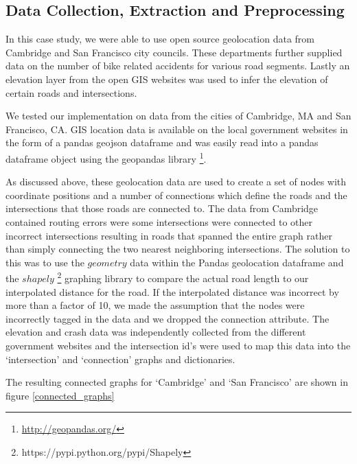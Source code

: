 \documentclass[11pt]{article}
\begin{document}
\subsection{Data Collection, Extraction and Preprocessing}
In this case study, we were able to use open source geolocation data from Cambridge and San Francisco city councils. These departments further supplied data on the number of bike related accidents for various road segments. Lastly an elevation layer from the open GIS websites was used to infer the elevation of certain roads and intersections.

We tested our implementation on data from the cities of Cambridge, MA and San Francisco, CA. GIS location data is available on the local government websites in the form of a pandas geojson dataframe and was easily read into a pandas dataframe object using the geopandas library \footnote{\url{http://geopandas.org/}}.
\par
As discussed above, these geolocation data are used to create a set of nodes with coordinate positions and a number of connections which define the roads and the intersections that those roads are connected to. The data from Cambridge contained routing errors were some intersections were connected to other incorrect intersections resulting in roads that spanned the entire graph rather than simply connecting the two nearest neighboring intersections. The solution to this was to use the $geometry$ data within the Pandas geolocation dataframe and the $shapely$ \footnote{https://pypi.python.org/pypi/Shapely} graphing library to compare the actual road length to our interpolated distance for the road. If the interpolated distance was incorrect by more than a factor of 10, we made the assumption that the nodes were incorrectly tagged in the data and we dropped the connection attribute. The elevation and crash data was independently collected from the different government websites and the intersection id's were used to map this data into the `intersection' and `connection' graphs and dictionaries.
\par The resulting connected graphs for `Cambridge' and `San Francisco' are shown in figure \ref{connected_graphs}
\end{document}

